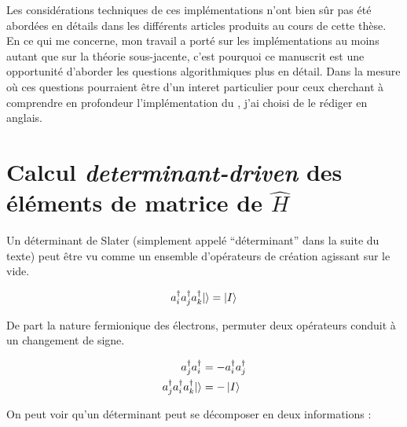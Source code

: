 \documentclass[./thesis.tex]{subfiles}
\begin{document}
Les considérations techniques de ces implémentations n'ont bien sûr pas été abordées en détails dans les différents articles produits au cours de cette thèse. En ce qui me concerne, mon travail a porté sur les implémentations au moins autant que sur la théorie sous-jacente, c'est pourquoi ce manuscrit est une opportunité d'aborder les questions algorithmiques plus en détail. Dans la mesure où ces questions pourraient être d'un interet particulier pour ceux cherchant à comprendre en profondeur l'implémentation du \QP, j'ai choisi de le rédiger en anglais.

\section{Calcul \emph{determinant-driven} des éléments de matrice de $\widehat H$}

Un déterminant de Slater (simplement appelé ``déterminant'' dans la suite du texte) peut être vu comme un ensemble d'opérateurs de création agissant sur le vide.


\begin{equation}
a^\dagger_{i} a^\dagger_{j} a^\dagger_{k} {\ket{}} = \ket{I}
\end{equation}

De part la nature fermionique des électrons, permuter deux opérateurs conduit à un changement de signe.

\begin{align}
a^\dagger_{j} a^\dagger_{i} & = -a^\dagger_{i} a^\dagger_{j} \\
a^\dagger_{j} a^\dagger_{i} a^\dagger_{k} {\ket{}} &=  -\ket{I}
\end{align}

On peut voir qu'un déterminant peut se décomposer en deux informations :
\end{document}
